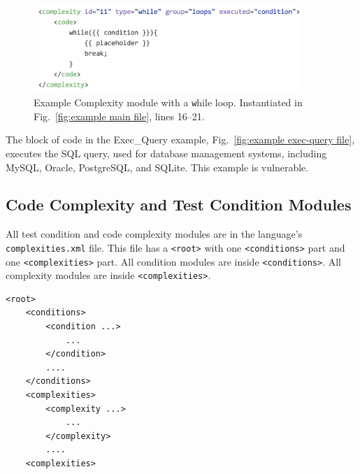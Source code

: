 \begin{figure}[tbp]
  \includegraphics[width=4in]{fig_Complexity_file_while.png}
  \caption{Example Complexity module with a {\texttt while} loop.  Instantiated in
    Fig.~\ref{fig:example main file}, lines 16--21.}
  \label{fig:example complexity-while file}
\end{figure}

The block of code in the Exec\_Query example, 
Fig.~\ref{fig:example exec-query file}, executes the SQL query, used 
for database management
systems, including MySQL, Oracle, PostgreSQL, and SQLite.  This example is
vulnerable.


\subsection{Code Complexity and Test Condition Modules}

All test condition and code complexity modules are in the 
language's \verb|complexities.xml| file.  This file has
a \verb|<root>| with one \verb|<conditions>| part and one
\verb|<complexities>| part.
All condition modules are inside \verb|<conditions>|.  All
complexity modules are inside \verb|<complexities>|.

\begin{verbatim}
<root>
    <conditions>
        <condition ...>
            ...
        </condition>
        ....
    </conditions>
    <complexities>
        <complexity ...>
            ...
        </complexity>
        ....
    <complexities>
\end{verbatim}

